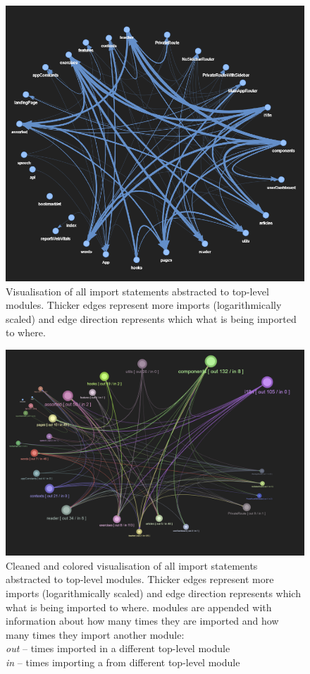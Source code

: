 \documentclass{article}
\begin{document}
\begin{figure}[h]
\includegraphics[width=\textwidth]{graphics/module_abstraction_dirty.png}
\caption{Visualisation of all import statements abstracted to top-level modules. 
Thicker edges represent more imports (logarithmically scaled) and edge 
direction represents which what is being imported to where.}
\label{fig:d:abs}
\end{figure}


\begin{figure}[h]
\includegraphics[width=\textwidth]{graphics/module_abstraction_cleaned.png}
\caption{Cleaned and colored visualisation of all import statements abstracted to top-level modules. 
Thicker edges represent more imports (logarithmically scaled) and edge 
direction represents which what is being imported to where.
modules are appended with information about how many times they are imported and how many times they import another module: \\
\hspace*{2em}\textit{out} -- times imported in a different top-level module \\
\hspace*{2em}\textit{in} -- times importing a from different top-level module}
\label{fig:d:clean}
\end{figure}
\end{document}
